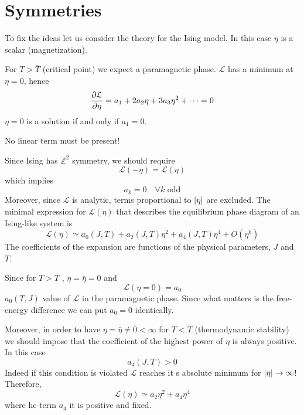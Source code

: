 \documentclass[../main/main.tex]{subfiles}
\begin{document}
\section{Symmetries}
To fix the ideas let us consider the theory for the Ising model. In this case \( \eta  \) is a scalar (magnetization).

For \( T > \bar{T}  \) (critical point) we expect a paramagnetic phase. \( \mathcal{L} \) has a minimum at \( \eta =0 \), hence
\begin{equation}
  \pdv{\mathcal{L}}{\eta } = a_1 + 2 a _2 \eta + 3 a _3 \eta ^2 + \dots = 0
\end{equation}
\( \eta = 0 \) is a solution if and only if \( a_1 = 0 \).
 \begin{remark}
No linear term must be present!
\end{remark}
Since Ising has \( \mathbb{Z}^2 \) symmetry, we should require
\begin{equation}
  \mathcal{L} (-\eta ) =   \mathcal{L} (\eta )
\end{equation}
which implies
\begin{equation}
  a_k = 0 \quad \forall k  \text{ odd}
\end{equation}
Moreover, since \( \mathcal{L} \) is analytic, terms proportional to \( \abs{\eta }  \)  are excluded.
The minimal expression for \( \mathcal{L}(\eta ) \) that describes the equilibrium phase diagram of an Ising-like system is
\begin{equation}
  \mathcal{L} (\eta ) \simeq a_0 (J,T) + a_2 (J,T) \eta  ^2 + a_4  (J,T) \eta  ^4 + O(\eta ^6)
\end{equation}
The coefficients of the expansion are functions of the physical parameters, \( J \) and \( T \).

Since for \( T > \bar{T}  \)  , \( \eta = \bar{\eta } = 0  \) and
\begin{equation}
  \mathcal{L} (\eta =0) = a_0
\end{equation}
\( a_0 (T,J) \) value of \( \mathcal{L} \) in the paramagnetic phase. Since what matters is the free-energy difference we can put \( a_0 =0 \) identically.

Moreover, in order to have \( \eta = \bar{\eta } \neq 0 < \infty   \) for \( T < \bar{T} \) (thermodynamic stability) we should impose that the coefficient of the highest power of \( \eta  \) is always positive. In this case
\begin{equation}
  a_4 (J,T)>0
\end{equation}
   Indeed if this condition is violated \( \mathcal{L} \) reaches it s absolute minimum for \( \abs{\eta } \rightarrow \infty   \)!
Therefore,
\begin{equation}
    \mathcal{L} (\eta ) \simeq  a_2 \eta  ^2 + a_4  \eta  ^4
\end{equation}
where he term \( a_4 \) it is positive and fixed.
\end{document}
